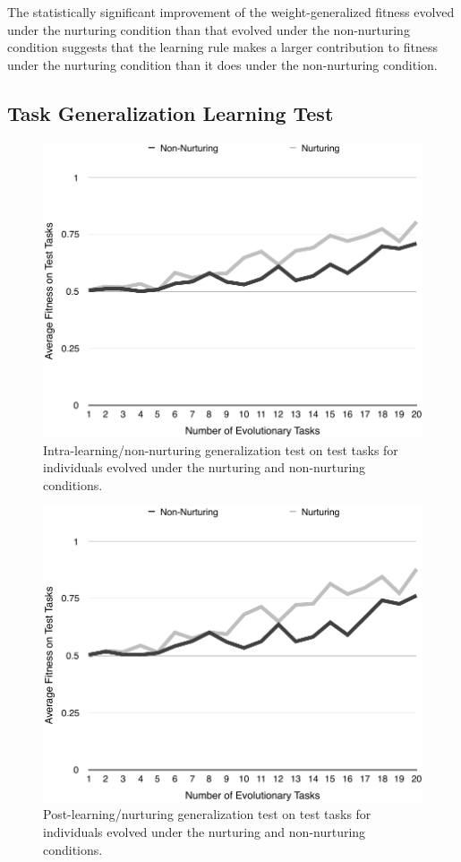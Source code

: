 \documentclass[master]{outhesis}
\begin{document}
The statistically significant improvement of the weight-generalized fitness evolved under the nurturing condition than that evolved under the non-nurturing condition
suggests that the learning rule makes a larger contribution to fitness under the nurturing condition than it does under the non-nurturing condition.

\subsection{Task Generalization Learning Test}

\begin{figure}[h]
	\centering
	\includegraphics{NonNurturingGeneralizationTestPlot.pdf}
	\caption{Intra-learning/non-nurturing generalization test on test tasks for individuals evolved under the nurturing and non-nurturing conditions.}
	\label{fig:T2IntraLearningGeneralizationTest}
\end{figure}

\begin{figure}[h]
	\centering
	\includegraphics{NurturingGeneralizationTestPlot.pdf}
	\caption{Post-learning/nurturing generalization test on test tasks for individuals evolved under the nurturing and non-nurturing conditions.}
	\label{fig:T2PostLearningGeneralizationTest}
\end{figure}
\end{document}
